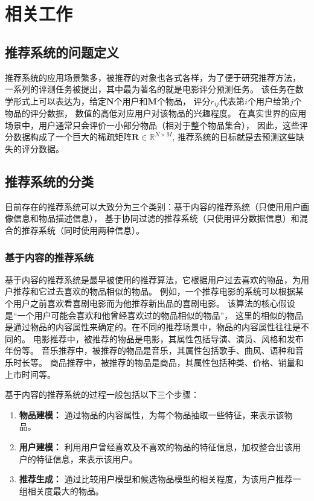 \chapter{相关工作}
\section{推荐系统的问题定义}
推荐系统的应用场景繁多，被推荐的对象也各式各样，为了便于研究推荐方法，
一系列的评测任务被提出，其中最为著名的就是电影评分预测任务。
该任务在数学形式上可以表达为，给定$\mathbf{N}$个用户和$\mathbf{M}$个物品，
评分$r_{ij}$代表第$i$个用户给第$j$个物品的评分数据，
数值的高低对应用户对该物品的兴趣程度。
在真实世界的应用场景中，用户通常只会评价一小部分物品（相对于整个物品集合），
因此，这些评分数据构成了一个巨大的稀疏矩阵$\mathbf{R} \in \mathbb{R}^{N \times M}$,
推荐系统的目标就是去预测这些缺失的评分数据。

\section{推荐系统的分类}
目前存在的推荐系统可以大致分为三个类别：基于内容的推荐系统（只使用用户画像信息和物品描述信息），
基于协同过滤的推荐系统（只使用评分数据信息）和混合的推荐系统（同时使用两种信息）。

\subsection{基于内容的推荐系统}
基于内容的推荐系统是最早被使用的推荐算法，它根据用户过去喜欢的物品，为用户推荐和它过去喜欢的物品相似的物品。
例如，一个推荐电影的系统可以根据某个用户之前喜欢看喜剧电影而为他推荐新出品的喜剧电影。
该算法的核心假设是``一个用户可能会喜欢和他曾经喜欢过的物品相似的物品''，
这里的相似的物品是通过物品的内容属性来确定的。在不同的推荐场景中，物品的内容属性往往是不同的。
电影推荐中，被推荐的物品是电影，其属性包括导演、演员、风格和发布年份等。
音乐推荐中，被推荐的物品是音乐，其属性包括歌手、曲风、语种和音乐时长等。
商品推荐中，被推荐的物品是商品，其属性包括种类、价格、销量和上市时间等。


基于内容的推荐系统的过程一般包括以下三个步骤：
\begin{enumerate}
\item \textbf{物品建模：} 通过物品的内容属性，为每个物品抽取一些特征，来表示该物品。
\item \textbf{用户建模：} 利用用户曾经喜欢及不喜欢的物品的特征信息，加权整合出该用户的特征信息，来表示该用户。
\item \textbf{推荐生成：} 通过比较用户模型和候选物品模型的相关程度，为该用户推荐一组相关度最大的物品。
\end{enumerate}

